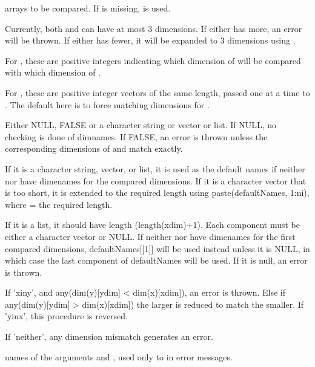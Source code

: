 \begin{Arguments}
\begin{ldescription}
\item[\code{x, y}] arrays to be compared.  If  is missing,  is used.

Currently, both  and  can have at most 3
dimensions.  If either has more, an error will be thrown.  If either
has fewer, it will be expanded to 3 dimensions using
. 

\item[\code{xdim, ydim}] For , these are positive integers indicating which
dimension of  will be compared with which dimension of
.  

For , these are positive integer vectors of the same
length, passed one at a time to .  The default here
is to force matching dimensions for .  

\item[\code{defaultNames}] Either NULL, FALSE or a character string or vector or list.  If
NULL, no checking is done of dimnames.  If FALSE, an error is thrown
unless the corresponding dimensions of  and  match
exactly. 

If it is a character string, vector, or list, it is used as the
default names if neither  nor  have dimenames for
the compared dimensions.  If it is a character vector that is too
short, it is extended to the required length using
paste(defaultNames, 1:ni), where  = the required length. 

If it is a list, it should have length (length(xdim)+1).  Each
component must be either a character vector or NULL.  If neither
 nor  have dimenames for the first compared
dimensions, defaultNames[[1]] will be used instead unless it is
NULL, in which case the last component of defaultNames will be
used.  If it is null, an error is thrown.  

\item[\code{subset}] If 'xiny', and any(dim(y)[ydim] < dim(x)[xdim]), an error is
thrown.  Else if any(dim(y)[ydim] > dim(x)[xdim]) the larger is
reduced to match the smaller.  If 'yinx', this procedure is
reversed.

If 'neither', any dimension mismatch generates an error.  

\item[\code{xName, yName}] names of the arguments  and , used only to in error
messages.  

\end{ldescription}
\end{Arguments}
